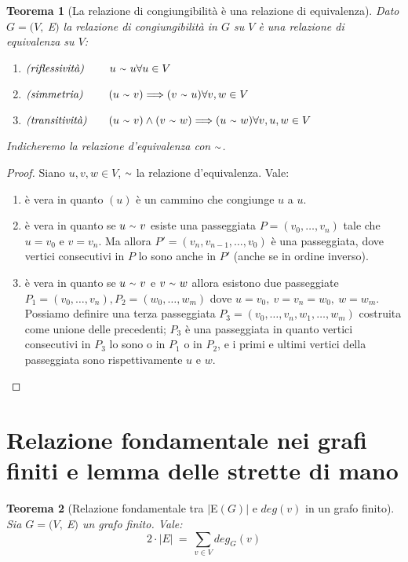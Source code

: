 \documentclass[12pt,twoscolu]{article}
\newcommand{\implica}{\Longrightarrow}
\newcommand{\Eps}{$E\:$}
\newcommand{\MathEps}{E}
\newcommand{\grafo}{(V, \: \Eps)}
\newcommand{\til}{\raise.17ex\hbox{$\scriptstyle\mathtt{\sim}$}}
\newtheorem{theorem}{Teorema}
\begin{document}
\begin{theorem}[La relazione di congiungibilità è una relazione di equivalenza]
Dato $G = \grafo$ la relazione di congiungibilità in $G$ su $V$ è una relazione di equivalenza su $V$:
\begin{enumerate}
\item$\textit{(riflessività) }\qquad u\ \til\ u \hfill \forall u \in V$
\item$\textit{(simmetria) }\qquad (u\ \til\ v) \implica (v\ \til\ u) \hfill \forall v, w \in V$
\item$\textit{(transitività)}\qquad (u\ \til\ v) \land (v\ \til\ w) \implica (u\ \til \ w) \hfill \forall v, u, w \in V$
\end{enumerate}
Indicheremo la relazione d'equivalenza con $\til$.
\end{theorem}

\begin{proof}
Siano $u, v, w \in V$, $\til$ la relazione d'equivalenza. Vale:
\begin{enumerate}
\item è vera in quanto $(u)$ è un cammino che congiunge $u$ a $u$.
\item è vera in quanto se $u\ \til\ v$ esiste una passeggiata $P = (v_0,\ldots, v_n)$ tale che $u = v_0$ e $v = v_n$. Ma allora $P' = (v_n, v_{n-1},\ldots ,v_0)$ è una passeggiata, dove vertici consecutivi in $P$ lo sono anche in $P'$ (anche se in ordine inverso).
\item è vera in quanto se $u\ \til\ v$ e $v\ \til\ w$ allora esistono due passeggiate $P_1 = (v_0,\ldots ,v_n), P_2 = (w_0,\ldots, w_m)$ dove $u = v_0,\ v = v_n = w_0,\ w = w_m$. Possiamo definire una terza passeggiata $P_3 = (v_0,\ldots ,v_n,w_1,\ldots ,w_m)$ costruita come unione delle precedenti; $P_3$ è una passeggiata in quanto vertici consecutivi in $P_3$ lo sono o in $P_1$ o in $P_2$, e i primi e ultimi vertici della passeggiata sono rispettivamente $u$ e $w$.
\end{enumerate}
\end{proof}

\section{Relazione fondamentale nei grafi finiti e lemma delle strette di mano}
\begin{theorem}[Relazione fondamentale tra $|\Eps(G)|$ e $deg(v)$ in un grafo finito]
Sia $G = \grafo$ un grafo finito. Vale:
$$ 2 \cdot | \MathEps | \ = \ \sum_{v\in V} deg_G (v) $$
\end{theorem}
\end{document}
